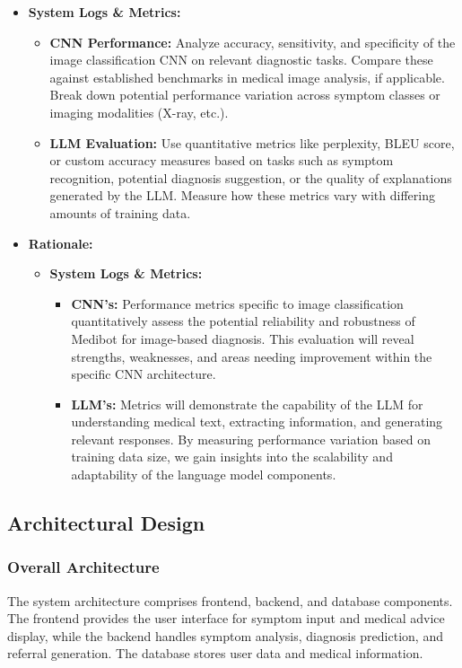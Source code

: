 \begin{itemize}
    \item \textbf{System Logs \& Metrics: } {
        \begin{itemize}
            \item \textbf{CNN Performance: } Analyze accuracy, sensitivity, and specificity of the image classification CNN on relevant diagnostic tasks. Compare these against established benchmarks in medical image analysis, if applicable. Break down potential performance variation across symptom classes or imaging modalities (X-ray, etc.).
            \item \textbf{LLM Evaluation: } Use quantitative metrics like perplexity, BLEU score, or custom accuracy measures based on tasks such as symptom recognition, potential diagnosis suggestion, or the quality of explanations generated by the LLM. Measure how these metrics vary with differing amounts of training data.
        \end{itemize}
    }
    \item \textbf{Rationale:} 
    \begin{itemize}
        \item \textbf{System Logs \& Metrics: } {
            \begin{itemize}
                \item \textbf{CNN's: } Performance metrics specific to image classification quantitatively assess the potential reliability and robustness of Medibot for image-based diagnosis. This evaluation will reveal strengths, weaknesses, and areas needing improvement within the specific CNN architecture.
                \item \textbf{LLM's: } Metrics will demonstrate the capability of the LLM for understanding medical text, extracting information, and generating relevant responses. By measuring performance variation based on training data size, we gain insights into the scalability and adaptability of the language model components.
            \end{itemize}
        }
    \end{itemize}

\end{itemize}

\subsection{Architectural Design}

\subsubsection{Overall Architecture}
The system architecture comprises frontend, backend, and database components. The frontend provides the user interface for symptom input and medical advice display, while the backend handles symptom analysis, diagnosis prediction, and referral generation. The database stores user data and medical information.

